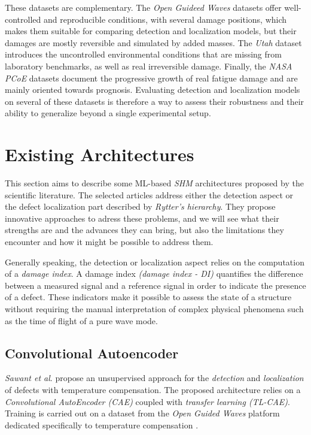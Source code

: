 \documentclass[12pt]{article}
\begin{document}
These datasets are complementary. The \textit{Open Guideed Waves} datasets offer well-controlled and reproducible conditions, with several damage positions, which makes them suitable for comparing detection and localization models, but their damages are mostly reversible and simulated by added masses. The \textit{Utah} dataset introduces the uncontrolled environmental conditions that are missing from laboratory benchmarks, as well as real irreversible damage. Finally, the \textit{NASA PCoE} datasets document the progressive growth of real fatigue damage and are mainly oriented towards prognosis. Evaluating detection and localization models on several of these datasets is therefore a way to assess their robustness and their ability to generalize beyond a single experimental setup.
 
\section{Existing Architectures}
 
This section aims to describe some ML-based \textit{SHM} architectures proposed by the scientific literature. The selected articles address either the detection aspect or the defect localization part described by \textit{Rytter's hierarchy}. They propose innovative approaches to adress these problems, and we will see what their strengths are and the advances they can bring, but also the limitations they encounter and how it might be possible to address them.   
 
Generally speaking, the detection or localization aspect relies on the computation of a \textit{damage index}. A damage index \textit{(damage index - DI)} quantifies the difference between a measured signal and a reference signal in order to indicate the presence of a defect. These indicators make it possible to assess the state of a structure without requiring the manual interpretation of complex physical phenomena such as the time of flight of a pure wave mode.
 
\subsection{Convolutional Autoencoder}
 
\textit{Sawant et al}. \cite{SAWANT2023106931} propose an unsupervised approach for the \textit{detection} and \textit{localization} of defects with temperature compensation. The proposed architecture relies on a \textit{Convolutional AutoEncoder (CAE)} coupled with \textit{transfer learning (TL-CAE)}. Training is carried out on a dataset from the \textit{Open Guided Waves} platform dedicated specifically to temperature compensation \cite{moll2019temperature, moll2019temperature_data}.  
 
\end{document}
